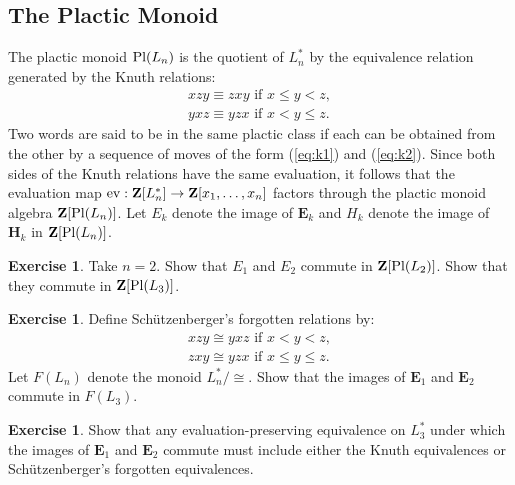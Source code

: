 \documentclass[11pt]{amsart}
\theoremstyle{definition}
\theoremstyle{example}
\newtheorem{exercise}[theorem]{Exercise}
\newcommand{\ev}{\textup{ev}}
\newcommand{\pl}{\textup{Pl}}
\begin{document}
\subsection{The Plactic Monoid}
\label{sec:plactic-monoid}
The plactic monoid $\pl(L_n)$ is the quotient of $L^*_n$ by the equivalence relation generated by the Knuth relations:
\begin{gather}
  \tag{$K1$}\label{eq:k1}
  xzy \equiv zxy \text{ if } x\leq y < z,
  \\
  \tag{$K2$}\label{eq:k2}
  yxz \equiv yzx \text{ if } x < y \leq z.
\end{gather}
Two words are said to be in the same plactic class if each can be obtained from the other by a sequence of moves of the form (\ref{eq:k1}) and (\ref{eq:k2}).
Since both sides of the Knuth relations have the same evaluation, it follows that the evaluation map $\ev:\mathbf Z[L^*_n]\to \mathbf Z[x_1,\dotsc,x_n]$ factors through the plactic monoid algebra $\mathbf Z[\pl(L_n)]$.
Let $E_k$ denote the image of $\mathbf E_k$ and $H_k$ denote the image of $\mathbf H_k$ in $\mathbf Z[\pl(L_n)]$.
\begin{exercise}
  Take $n=2$.
  Show that $E_1$ and $E_2$ commute in $\mathbf Z[\pl(L_2)]$.
  Show that they commute in $\mathbf Z[\pl(L_3)]$.
\end{exercise}
\begin{exercise}
  \label{exercise:forgotten}
  Define Sch\"utzenberger's forgotten relations by:
  \begin{gather}
    \tag{$F1$}\label{eq:f1}
    xzy \cong yxz \text{ if } x < y < z,
    \\
    \tag{$F2$}\label{eq:f2}
    zxy \cong yzx \text{ if } x \leq y \leq z.
  \end{gather}
  Let $F(L_n)$ denote the monoid $L_n^*/\cong$.
  Show that the images of $\mathbf E_1$ and $\mathbf E_2$ commute in $F(L_3)$.
\end{exercise}
\begin{exercise}
  Show that any evaluation-preserving equivalence on $L_3^*$ under which the images of $\mathbf E_1$ and $\mathbf E_2$ commute must include either the Knuth equivalences or Sch\"utzenberger's forgotten equivalences.
\end{exercise}
\end{document}
